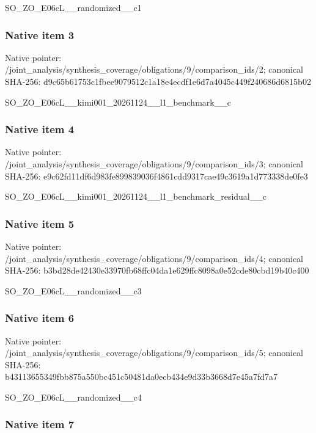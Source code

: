 \documentclass[10pt,a4paper]{article}
\begin{document}
SO\_ZO\_E06cL\_\_randomized\_\_c1


\subsubsection{Native item 3}


Native pointer: /joint\_analysis/synthesi\allowbreak{}s\_coverage/obligations/9\allowbreak{}/comparison\_ids/2; canonical SHA-256: d9c65b61753c1fbee9079512\allowbreak{}c1a18e4ecdf1e6d7a4045c44\allowbreak{}9f240686d6815b02


SO\_ZO\_E06cL\_\_kimi001\_202\allowbreak{}61124\_\_l1\_benchmark\_\_c


\subsubsection{Native item 4}


Native pointer: /joint\_analysis/synthesi\allowbreak{}s\_coverage/obligations/9\allowbreak{}/comparison\_ids/3; canonical SHA-256: e9c62fd11df6d983fe899839\allowbreak{}036f4861cdd9317cae49c361\allowbreak{}9a1d773338de0fe3


SO\_ZO\_E06cL\_\_kimi001\_202\allowbreak{}61124\_\_l1\_benchmark\_resi\allowbreak{}dual\_\_c


\subsubsection{Native item 5}


Native pointer: /joint\_analysis/synthesi\allowbreak{}s\_coverage/obligations/9\allowbreak{}/comparison\_ids/4; canonical SHA-256: b3bd28de42430e33970fb68f\allowbreak{}fc04da1e629ffc8098a0e52c\allowbreak{}de80cbd19b40c400


SO\_ZO\_E06cL\_\_randomized\_\_c3


\subsubsection{Native item 6}


Native pointer: /joint\_analysis/synthesi\allowbreak{}s\_coverage/obligations/9\allowbreak{}/comparison\_ids/5; canonical SHA-256: b43113655349fbb875a550bc\allowbreak{}451c50481da0ecb434e9d33b\allowbreak{}3668d7e45a7fd7a7


SO\_ZO\_E06cL\_\_randomized\_\_c4


\subsubsection{Native item 7}
\end{document}
